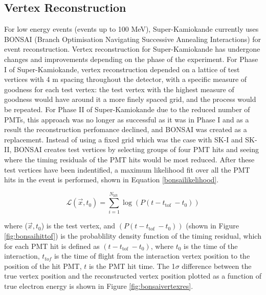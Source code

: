 \subsection{Vertex Reconstruction}
For low energy events (events up to 100 MeV), Super-Kamiokande currently uses BONSAI (Branch Optimisation Navigating Successive Annealing Interactions) for event reconstruction. Vertex reconstruction for Super-Kamiokande has undergone changes and improvements depending on the phase of the experiment. 
\newline{}
For Phase I of Super-Kamiokande, vertex reconstruction depended on a lattice of test vertices with 4 m spacing throughout the detector, with a specific measure of goodness for each test vertex: the test vertex with the highest measure of goodness would have around it a more finely spaced grid, and the process would be repeated. For Phase II of Super-Kamiokande due to the reduced number of PMTs, this approach was no longer as successful as it was in Phase I and as a result the reconstruction perfomance declined, and BONSAI was created as a replacement. Instead of using a fixed grid which was the case with SK-I and SK-II, BONSAI creates test vertices by selecting groups of four PMT hits and seeing where the timing residuals of the PMT hits would be most reduced. After these test vertices have been indentified, a maximum likelihood fit over all the PMT hits in the event is performed, shown in Equation \ref{bonsailikelihood}.

\begin{equation}
    \mathcal{L}(\vec{x}, t_{0})=\sum_{i=1}^{N_{\text {hlt }}} \log (P(t-t_{\text {tof }}-t_{0}))
\label{bonsailikelihood}
\end{equation}

where ($\vec{x}, t_{0}$) is the test vertex, and $(P(t-t_{\text {tof }}-t_{0}))$ (shown in Figure \ref{fig:bonsaihittof}) is the probablility density function of the timing residual, which for each PMT hit is defined as $(t-t_{\text {tof }}-t_{0})$, where $t_{0}$ is the time of the interaction, $t_{tof}$ is the time of flight from the interaction vertex position to the position of the hit PMT, $t$ is the PMT hit time. The 1$\sigma$ difference between the true vertex position and the reconstructed vertex position plotted as a function of true electron energy is shown in Figure \ref{fig:bonsaivertexres}. 

